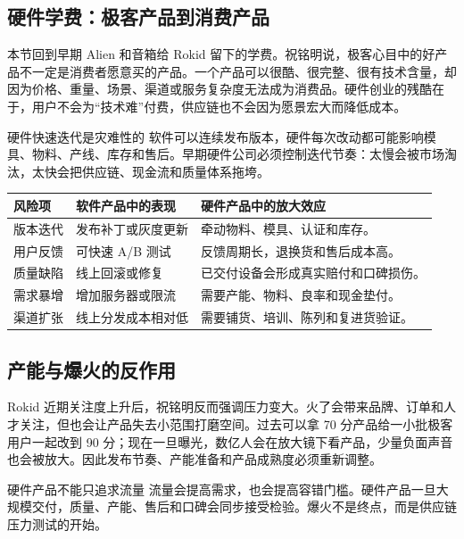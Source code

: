 \documentclass[a4paper]{article}
\begin{document}
\subsection{硬件学费：极客产品到消费产品}

本节回到早期 Alien 和音箱给 Rokid 留下的学费。祝铭明说，极客心目中的好产品不一定是消费者愿意买的产品。一个产品可以很酷、很完整、很有技术含量，却因为价格、重量、场景、渠道或服务复杂度无法成为消费品。硬件创业的残酷在于，用户不会为“技术难”付费，供应链也不会因为愿景宏大而降低成本。

\begin{warningbox}{硬件快速迭代是灾难性的}
软件可以连续发布版本，硬件每次改动都可能影响模具、物料、产线、库存和售后。早期硬件公司必须控制迭代节奏：太慢会被市场淘汰，太快会把供应链、现金流和质量体系拖垮。
\end{warningbox}

\noindent\begin{tabularx}{\textwidth}{p{}p{}X}
\toprule
风险项 & 软件产品中的表现 & 硬件产品中的放大效应 \\
\midrule
版本迭代 & 发布补丁或灰度更新 & 牵动物料、模具、认证和库存。 \\
用户反馈 & 可快速 A/B 测试 & 反馈周期长，退换货和售后成本高。 \\
质量缺陷 & 线上回滚或修复 & 已交付设备会形成真实赔付和口碑损伤。 \\
需求暴增 & 增加服务器或限流 & 需要产能、物料、良率和现金垫付。 \\
渠道扩张 & 线上分发成本相对低 & 需要铺货、培训、陈列和复进货验证。 \\
\bottomrule
\end{tabularx}

\subsection{产能与爆火的反作用}

Rokid 近期关注度上升后，祝铭明反而强调压力变大。火了会带来品牌、订单和人才关注，但也会让产品失去小范围打磨空间。过去可以拿 70 分产品给一小批极客用户一起改到 90 分；现在一旦曝光，数亿人会在放大镜下看产品，少量负面声音也会被放大。因此发布节奏、产能准备和产品成熟度必须重新调整。

\begin{importantbox}{硬件产品不能只追求流量}
流量会提高需求，也会提高容错门槛。硬件产品一旦大规模交付，质量、产能、售后和口碑会同步接受检验。爆火不是终点，而是供应链压力测试的开始。
\end{importantbox}
\end{document}

